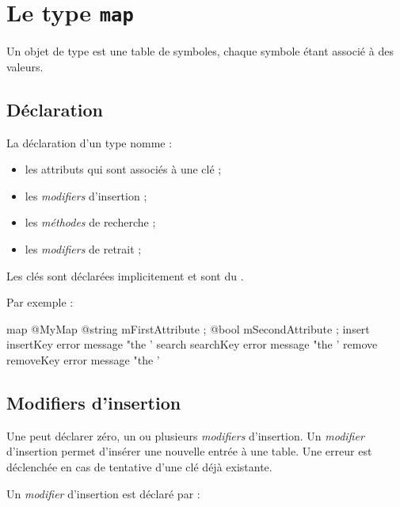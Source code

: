 
\chapter{Le type \texttt{map}}

Un objet de type  est une table de symboles, chaque symbole étant associé à des valeurs.

\section{Déclaration}

La déclaration d'un type  nomme :
\begin{itemize}
  \item les attributs qui sont associés à une clé ;
  \item les \emph{modifiers} d'insertion ;
  \item les \emph{méthodes} de recherche ;
  \item les \emph{modifiers} de retrait ;
\end{itemize}

Les clés sont déclarées implicitement et sont du .

Par exemple :

\begin{galgascode}
map @MyMap {
  @string mFirstAttribute ;
  @bool mSecondAttribute ;
  insert insertKey error message "the '%
  search searchKey error message "the '%
  remove removeKey error message "the '%
}
\end{galgascode}






\section{Modifiers d'insertion}

Une  peut déclarer zéro, un ou plusieurs \emph{modifiers} d'insertion. Un \emph{modifier} d'insertion permet d'insérer une nouvelle entrée à une table. Une erreur est déclenchée en cas de tentative d'une clé déjà existante.


Un \emph{modifier} d'insertion est déclaré par :

